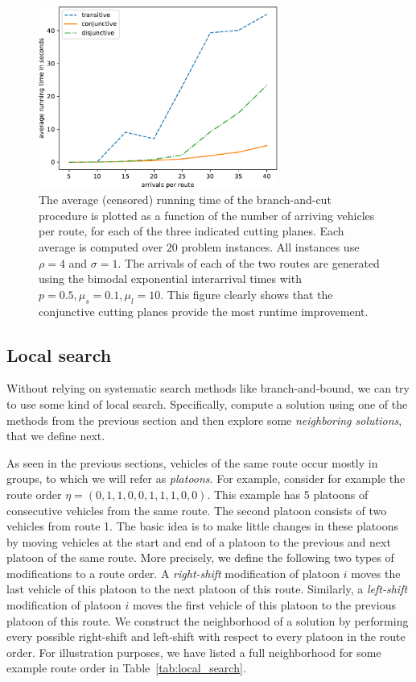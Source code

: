 \documentclass[a4paper]{article}
\theoremstyle{definition}
\theoremstyle{plain}
\begin{document}
\begin{figure}
  \centering
  \includegraphics[width=0.7\textwidth]{data-single/running_times.pdf}
  \caption{The average (censored) running time of the branch-and-cut procedure
    is plotted as a function of the number of arriving vehicles per route, for
    each of the three indicated cutting planes. Each average is computed over
    $20$ problem instances. All instances use $\rho = 4$ and $\sigma = 1$. The arrivals
    of each of the two routes are generated using the bimodal exponential
    interarrival times with $p=0.5, \mu_{s} = 0.1, \mu_{l} = 10$. This figure
    clearly shows that the conjunctive cutting planes provide the most runtime
    improvement.}
  \label{fig:running_time}
\end{figure}

\subsection{Local search}

Without relying on systematic search methods like branch-and-bound, we can try
to use some kind of local search. Specifically, compute a solution using one of
the methods from the previous section and then explore some \textit{neighboring
  solutions}, that we define next.

As seen in the previous sections, vehicles of the same route occur mostly in
groups, to which we will refer as \textit{platoons}. For example, consider for example
the route order $\eta = (0, 1, 1, 0, 0, 1, 1, 1, 0, 0)$. This example has 5
platoons of consecutive vehicles from the same route. The second platoon
consists of two vehicles from route 1.
The basic idea is to make little changes in these platoons by moving vehicles at
the start and end of a platoon to the previous and next platoon of the same
route.
%
More precisely, we define the following two types of modifications to a route
order. A \textit{right-shift} modification of platoon $i$ moves the last vehicle of this
platoon to the next platoon of this route. Similarly, a \textit{left-shift} modification
of platoon $i$ moves the first vehicle of this platoon to the previous platoon
of this route.
%
We construct the neighborhood of a solution by performing every possible
right-shift and left-shift with respect to every platoon in the route order. For
illustration purposes, we have listed a full neighborhood for some example route
order in Table~\ref{tab:local_search}.
\end{document}
